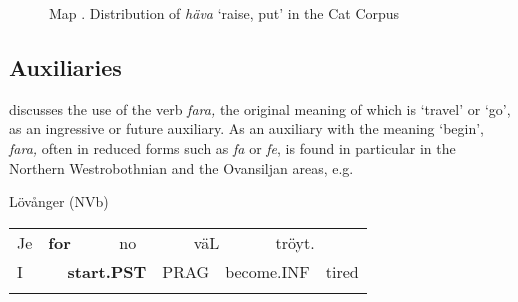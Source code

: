 \begin{figure}[h]

\begin{minipage}{6.7102in}

\begin{stylecaption}
Map . Distribution of \textit{häva} ‘raise, put’ in the Cat Corpus

\end{stylecaption}

\end{minipage}

\end{figure}

\subsection{\rmfamily Auxiliaries}

\begin{styleBodyTextFirst}
\citet{Holm1941} discusses the use of the verb \textit{fara, }the original meaning of which is ‘travel’ or ‘go’, as an ingressive or future auxiliary. As an auxiliary with the meaning ‘begin’, \textit{fara, }often in reduced forms such as \textit{fa} or \textit{fe}, is found in particular in the Northern Westrobothnian and the Ovansiljan areas, e.g. 

\end{styleBodyTextFirst}

\begin{listWWNumileveli}
\item 

\begin{styleExample}
Lövånger (NVb)

\end{styleExample}

\end{listWWNumileveli}

\begin{tabular}{llllllllll}
\lsptoprule
Je & \multicolumn{2}{l}{{\bfseries for}

} & \multicolumn{2}{l}{no

} & \multicolumn{2}{l}{väL

} & \multicolumn{2}{l}{tröyt.

} & \\
\multicolumn{2}{l}{I

} & \multicolumn{2}{l}{{\bfseries start.PST}

} & \multicolumn{2}{l}{PRAG

} & \multicolumn{2}{l}{become.INF

} & \multicolumn{2}{l}{tired

}\\
\lspbottomrule
\end{tabular}

